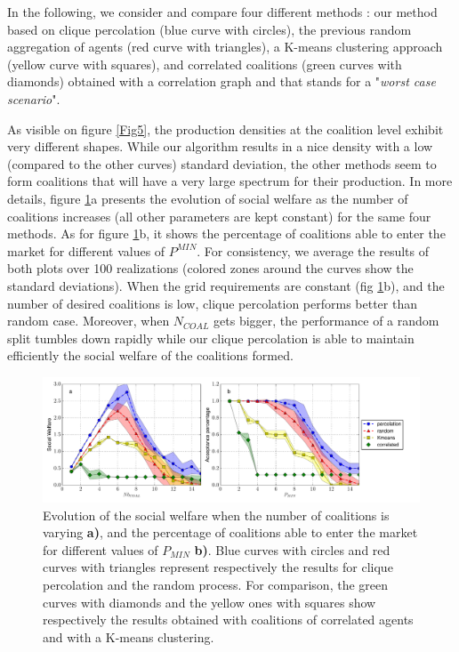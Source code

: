 \documentclass[conference]{IEEEtran}
\begin{document}
In the following, we consider and compare four different methods : our method based on clique percolation (blue curve with circles), the previous random aggregation of agents (red curve with triangles), a K-means clustering approach (yellow curve with squares), and correlated coalitions (green curves with diamonds) obtained with a correlation graph and that stands for a "\textit{worst case scenario}".

As visible on figure \ref{Fig5}, the production densities at the coalition level exhibit very different shapes. While our algorithm results in a nice density with a low (compared to the other curves) standard deviation, the other methods seem to form coalitions that will have a very large spectrum for their production. In more details, figure \ref{Fig4}a presents the evolution of social welfare as the number of coalitions increases (all other parameters are kept constant) for the same four methods. As for figure \ref{Fig4}b, it shows the percentage of coalitions able to enter the market for different values of $ P^{MIN} $. For consistency, we average the results of both plots over 100 realizations (colored zones around the curves show the standard deviations). When the grid requirements are constant (fig \ref{Fig4}b), and the number of desired coalitions is low, clique percolation performs better than random case. Moreover, when $ N_{COAL} $ gets bigger, the performance of a random split tumbles down rapidly while our clique percolation is able to maintain efficiently the social welfare of the coalitions formed.

\begin{figure}
\begin{minipage}[c]{\textwidth}
	\begin{center}
  		\includegraphics[scale=0.45]{figure10/perc2.pdf}
  			\caption{Evolution of the social welfare when the number of coalitions is varying \textbf{a)}, and the percentage of coalitions able to enter the market for different values of $ P_{MIN} $ \textbf{b)}. Blue curves with circles and red curves with triangles represent respectively the results for clique percolation and the random process. For comparison, the green curves with diamonds and the yellow ones with squares show respectively the results obtained with coalitions of correlated agents and with a K-means clustering.}
 		\label{Fig4}
	\end{center}
\end{minipage}

\end{figure}
\end{document}
